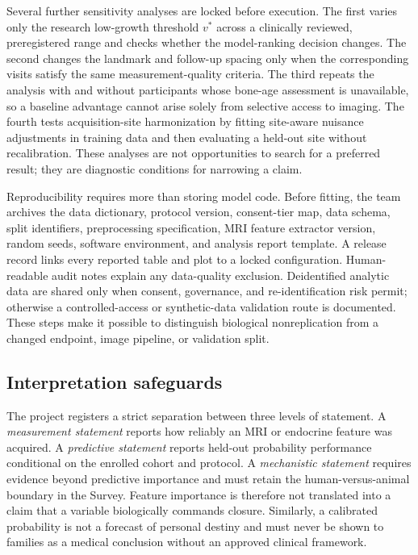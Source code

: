 \documentclass[conference]{IEEEtran}
\begin{document}
Several further sensitivity analyses are locked before execution. The first varies only the research low-growth threshold $v^*$ across a clinically reviewed, preregistered range and checks whether the model-ranking decision changes. The second changes the landmark and follow-up spacing only when the corresponding visits satisfy the same measurement-quality criteria. The third repeats the analysis with and without participants whose bone-age assessment is unavailable, so a baseline advantage cannot arise solely from selective access to imaging. The fourth tests acquisition-site harmonization by fitting site-aware nuisance adjustments in training data and then evaluating a held-out site without recalibration. These analyses are not opportunities to search for a preferred result; they are diagnostic conditions for narrowing a claim.

Reproducibility requires more than storing model code. Before fitting, the team archives the data dictionary, protocol version, consent-tier map, data schema, split identifiers, preprocessing specification, MRI feature extractor version, random seeds, software environment, and analysis report template. A release record links every reported table and plot to a locked configuration. Human-readable audit notes explain any data-quality exclusion. Deidentified analytic data are shared only when consent, governance, and re-identification risk permit; otherwise a controlled-access or synthetic-data validation route is documented. These steps make it possible to distinguish biological nonreplication from a changed endpoint, image pipeline, or validation split.

\subsection{Interpretation safeguards}

The project registers a strict separation between three levels of statement. A \emph{measurement statement} reports how reliably an MRI or endocrine feature was acquired. A \emph{predictive statement} reports held-out probability performance conditional on the enrolled cohort and protocol. A \emph{mechanistic statement} requires evidence beyond predictive importance and must retain the human-versus-animal boundary in the Survey. Feature importance is therefore not translated into a claim that a variable biologically commands closure. Similarly, a calibrated probability is not a forecast of personal destiny and must never be shown to families as a medical conclusion without an approved clinical framework.
\end{document}

